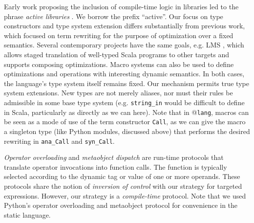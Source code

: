\documentclass[9pt,preprint]{sigplanconf}
\newcommand{\lstinlinep}[1]{\lstinline[language=Python,basicstyle=\ttfamily\small]{#1}}
\begin{document}

Early work proposing the inclusion of compile-time logic in libraries led to the phrase {\it active libraries} \cite{activelibraries}. We borrow the prefix ``active''. Our focus on type constructors and type system extension differs substantially from previous work, which focused on term rewriting for the purpose of optimization over a fixed semantics. Several contemporary projects have the same goals, e.g. LMS \cite{Rompf:2012:LMS}, which allows staged translation of well-typed Scala programs to other targets and supports composing optimizations. Macro systems can also be used to define optimizations and operations with interesting dynamic semantics. In both cases, the language's type system itself remains fixed. Our mechanism permits true type system extensions. New types are not merely aliases, nor must their rules be admissible in some base type system (e.g. \lstinlinep{string_in} would be difficult to define in Scala, particularly as directly as we can here). Note that in @\texttt{lang}, macros can be seen as a mode of use of the term constructor \verb|Call|, as we can give the macro a singleton type (like Python modules, discussed above) that performs the desired rewriting in \verb|ana_Call| and \verb|syn_Call|.


{\it Operator overloading} \cite{vanWijngaarden:Mailloux:Peck:Koster:Sintzoff:Lindsey:Meertens:Fisker:acta:1975} and {\it metaobject dispatch} \cite{Kiczales91} are run-time protocols that translate operator invocations into function calls. The function is typically selected according to the dynamic tag or value of one or more operands. These protocols share the notion of {\it inversion of control} with our strategy for targeted expressions. However, our strategy is a {\it compile-time} protocol. Note that we used Python's operator overloading and metaobject protocol for convenience in the static language. %
\end{document}

